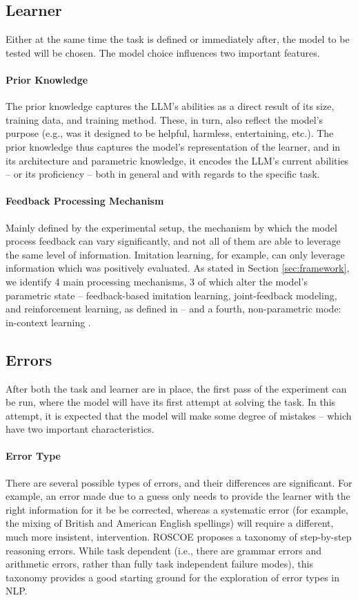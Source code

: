 \subsection{Learner}
Either at the same time the task is defined or immediately after, the model to be tested will be chosen. The model choice influences two important features.

\paragraph{Prior Knowledge} The prior knowledge captures the LLM's abilities as a direct result of its size, training data, and training method. These, in turn, also reflect the model's purpose (e.g., was it designed to be helpful, harmless, entertaining, etc.). The prior knowledge thus captures the model's  representation of the learner, and in its architecture and parametric knowledge, it encodes the LLM's current abilities -- or its proficiency -- both in general and with regards to the specific task.

\paragraph{Feedback Processing Mechanism} Mainly defined by the experimental setup, the mechanism by which the model process feedback can vary significantly, and not all of them are able to leverage the same level of information. Imitation learning, for example, can only leverage information which was positively evaluated. As stated in Section \ref{sec:framework}, we identify 4 main processing mechanisms, 3 of which alter the model's parametric state -- feedback-based imitation learning, joint-feedback modeling, and reinforcement learning, as defined in \citet{fernandes_bridging_2023} -- and a fourth, non-parametric mode: in-context learning \citep{brown2020language}.

\subsection{Errors}
After both the task and learner are in place, the first pass of the experiment can be run, where the model will have its first attempt at solving the task. In this attempt, it is expected that the model will make some degree of mistakes -- which have two important characteristics.

\paragraph{Error Type} There are several possible types of errors, and their differences are significant. For example, an error made due to a guess only needs to provide the learner with the right information for it be be corrected, whereas a systematic error (for example, the mixing of British and American English spellings) will require a different, much more insistent, intervention. ROSCOE \citep{golovneva2023roscoe} proposes a taxonomy of step-by-step reasoning errors. While task dependent (i.e., there are grammar errors and arithmetic errors, rather than fully task independent failure modes), this taxonomy provides a good starting ground for the exploration of error types in NLP.

